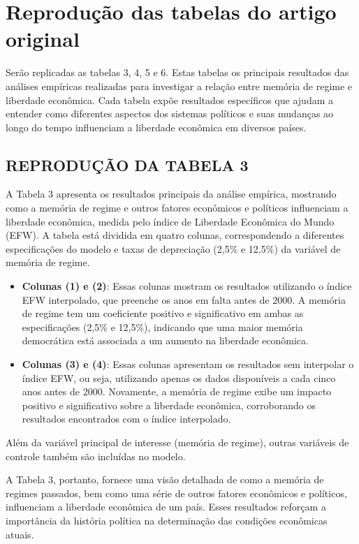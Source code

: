 \section{Reprodução das tabelas do artigo original}

Serão replicadas as tabelas 3, 4, 5 e 6. Estas tabelas os principais resultados das análises empíricas realizadas para investigar a relação entre memória de regime e liberdade econômica. Cada tabela expõe resultados específicos que ajudam a entender como diferentes aspectos dos sistemas políticos e suas mudanças ao longo do tempo influenciam a liberdade econômica em diversos países.

\subsection{REPRODUÇÃO DA TABELA 3}

A Tabela 3 apresenta os resultados principais da análise empírica, mostrando como a memória de regime e outros fatores econômicos e políticos influenciam a liberdade econômica, medida pelo índice de Liberdade Econômica do Mundo (EFW). A tabela está dividida em quatro colunas, correspondendo a diferentes especificações do modelo e taxas de depreciação (2,5\% e 12,5\%) da variável de memória de regime.

\begin{itemize}
    \item \textbf{Colunas (1) e (2)}: Essas colunas mostram os resultados utilizando o índice EFW interpolado, que preenche os anos em falta antes de 2000. A memória de regime tem um coeficiente positivo e significativo em ambas as especificações (2,5\% e 12,5\%), indicando que uma maior memória democrática está associada a um aumento na liberdade econômica.
    \item \textbf{Colunas (3) e (4)}: Essas colunas apresentam os resultados sem interpolar o índice EFW, ou seja, utilizando apenas os dados disponíveis a cada cinco anos antes de 2000. Novamente, a memória de regime exibe um impacto positivo e significativo sobre a liberdade econômica, corroborando os resultados encontrados com o índice interpolado.
\end{itemize}

Além da variável principal de interesse (memória de regime), outras variáveis de controle também são incluídas no modelo.

A Tabela 3, portanto, fornece uma visão detalhada de como a memória de regimes passados, bem como uma série de outros fatores econômicos e políticos, influenciam a liberdade econômica de um país. Esses resultados reforçam a importância da história política na determinação das condições econômicas atuais.


